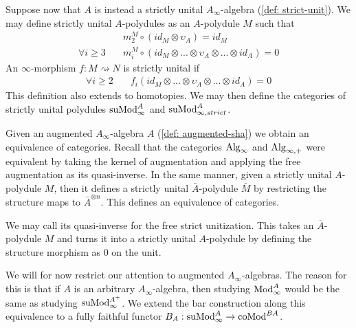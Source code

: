 \documentclass[../thesis.tex]{subfiles}
\begin{document}
            Suppose now that $A$ is instead a strictly unital $A_\infty$-algebra (\ref{def: strict-unit}). We may define strictly unital $A$-polydules as an $A$-polydule $M$ such that
            \begin{align*}
                & m^M_2\circ (id_M \otimes \upsilon_A) = id_M \\
                \forall i\geq 3\quad & m^M_i\circ (id_M \otimes ... \otimes \upsilon_A \otimes ... \otimes id_A) = 0
            \end{align*}
            An $\infty$-morphism $f : M \rightsquigarrow N$ is strictly unital if
            \begin{align*}
                \forall i\geq 2 \quad & f_i(id_M \otimes ... \otimes \upsilon_A \otimes ... \otimes id_A) = 0 
            \end{align*}
            This definition also extends to homotopies. We may then define the categories of strictly unital polydules $\tt{suMod}_\infty^A$ and $\tt{suMod}_{\infty, strict}^A$.

            Given an augmented $A_\infty$-algebra $A$ (\ref{def: augmented-sha}) we obtain an equivalence of categories. Recall that the categories $\tt{Alg}_\infty$ and $\tt{Alg}_{\infty,+}$ were equivalent by taking the kernel of augmentation and applying the free augmentation as its quasi-inverse. In the same manner, given a strictly unital $A$-polydule $M$, then it defines a strictly unital $\bar{A}$-polydule $\bar{M}$ by restricting the structure maps to $\bar{A}^{\otimes n}$. This defines an equivalence of categories.
            \begin{center}
            \end{center}
            We may call its quasi-inverse for the free strict unitization. This takes an $\overline{A}$-polydule $M$ and turns it into a strictly unital $A$-polydule by defining the structure morphism as $0$ on the unit.

            We will for now restrict our attention to augmented $A_\infty$-algebras. The reason for this is that if $A$ is an arbitrary $A_\infty$-algebra, then studying $\tt{Mod}_\infty^A$ would be the same as studying $\tt{suMod}_\infty^{A^+}$. We extend the bar construction along this equivalence to a fully faithful functor $B_A : \tt{suMod}_\infty^A \rightarrow \tt{coMod}^{BA}$.
\end{document}
